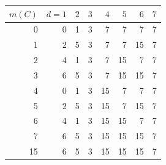 \begin{tabular}{r*{7}{r}}
\toprule
$m(C)$ & $d=1$ & $2$ & $3$ & $4$ & $5$ & $6$ & $7$\\
\midrule
0 & 0 & 1 & 3 & 7 & 7 & 7 & 7\\
1 & 2 & 5 & 3 & 7 & 7 & 15 & 7\\
2 & 4 & 1 & 3 & 7 & 15 & 7 & 7\\
3 & 6 & 5 & 3 & 7 & 15 & 15 & 7\\
4 & 0 & 1 & 3 & 15 & 7 & 7 & 7\\
5 & 2 & 5 & 3 & 15 & 7 & 15 & 7\\
6 & 4 & 1 & 3 & 15 & 15 & 7 & 7\\
7 & 6 & 5 & 3 & 15 & 15 & 15 & 7\\
15 & 6 & 5 & 3 & 15 & 15 & 15 & 7\\
\bottomrule
\end{tabular}
